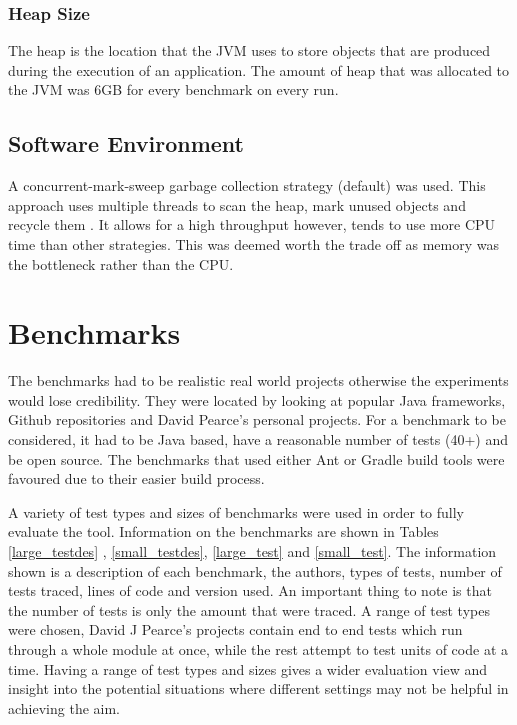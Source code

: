 \documentclass[11pt
              , a4paper
              , twoside
              , openright
              ]{report}
\begin{document}
\subsubsection{Heap Size}
The heap is the location that the JVM uses to store objects that are produced during the execution of an application. The amount of heap that was allocated to the JVM was 6GB for every benchmark on every run.

\subsection{Software Environment}

A concurrent-mark-sweep garbage collection strategy (default) was used. This approach uses multiple threads to scan the heap, mark unused objects and recycle them \cite{oracle2015}. It allows for a high throughput however, tends to use more CPU time than other strategies. This was deemed worth the trade off as memory was the bottleneck rather than the CPU.

\section{Benchmarks}
\label{S:bench}
The benchmarks had to be realistic real world projects otherwise the experiments would lose credibility. They were located by looking at popular Java frameworks, Github repositories and David Pearce's personal projects. For a benchmark to be considered, it had to be Java based, have a reasonable number of tests (40+) and be open source. The benchmarks that used either Ant or Gradle build tools were favoured due to their easier build process.

A variety of test types and sizes of benchmarks were used in order to fully evaluate the tool. Information on the benchmarks are shown in Tables \ref{large_testdes} , \ref{small_testdes}, \ref{large_test} and \ref{small_test}. The information shown is a description of each benchmark, the authors, types of tests, number of tests traced, lines of code and version used. An important thing to note is that the number of tests is only the amount that were traced. A range of test types were chosen, David J Pearce's projects contain end to end tests which run through a whole module at once, while the rest attempt to test units of code at a time. Having a range of test types and sizes gives a wider evaluation view and insight into the potential situations where different settings may not be helpful in achieving the aim.
\end{document}

